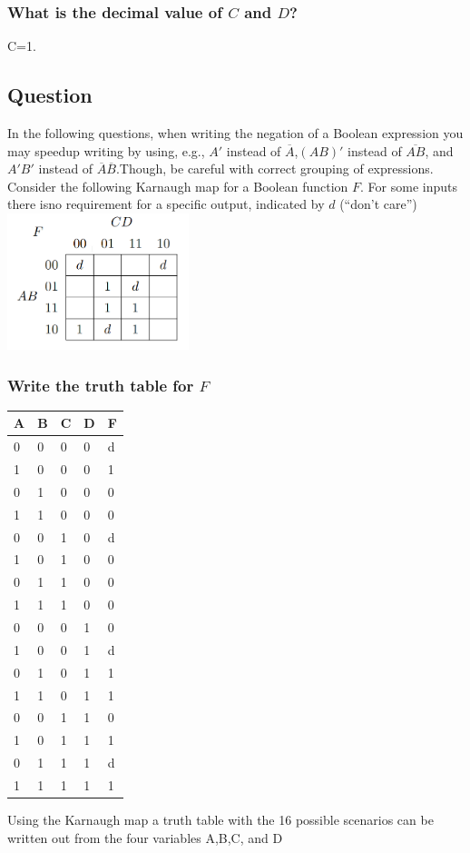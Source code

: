 \documentclass[12pt, a4paper]{article}
\begin{document}
			\subsubsection{What is the decimal value of $C$ and $D$?}
				C=1.
		\subsection{Question}
			In the following questions, when writing the negation of a Boolean expression you may speedup writing by using, e.g., $A'$ instead of $\overline{A}$,$(AB)'$ instead of $\overline{AB}$, and $A'B'$ instead of $\overline{A}\overline{B}$.Though, be careful with correct grouping of expressions.\\[4mm]
			Consider the following Karnaugh map for a Boolean function $F$. For some inputs there isno requirement for a specific output, indicated by $d$ (“don’t care”)\\
			\includegraphics[width=200px]{assets/2.png}
			\subsubsection{Write the truth table for $F$}
				\begin{table}[h!]
				\begin{tabular}{|l|l|l|l|l|}
				\hline
				A&B&C&D&F\\
				\hline
				0&0&0&0&d\\
				\hline
				1&0&0&0&1\\
				\hline
				0&1&0&0&0\\
				\hline
				1&1&0&0&0\\
				\hline
				0&0&1&0&d\\
				\hline
				1&0&1&0&0\\
				\hline
				0&1&1&0&0\\
				\hline
				1&1&1&0&0\\
				\hline
				0&0&0&1&0\\
				\hline
				1&0&0&1&d\\
				\hline
				0&1&0&1&1\\
				\hline
				1&1&0&1&1\\
				\hline
				0&0&1&1&0\\
				\hline
				1&0&1&1&1\\
				\hline
				0&1&1&1&d\\
				\hline
				1&1&1&1&1\\
				\hline
				\end{tabular}
				\end{table}
				Using the Karnaugh map a truth table with the 16 possible scenarios can be written out from the four variables A,B,C, and D
\end{document}
